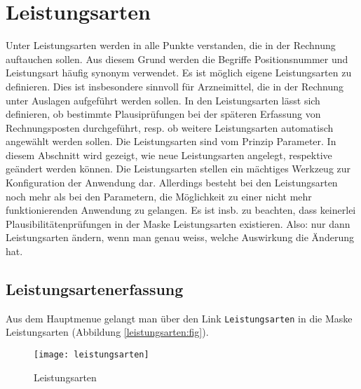 \section{Leistungsarten}\label{leistungsarten:abs}
Unter Leistungsarten werden in \tinyHeb\/ alle Punkte verstanden, die in
der Rechnung auftauchen sollen. Aus diesem Grund werden die Begriffe
Positionsnummer und Leistungsart häufig synonym verwendet.
Es ist möglich eigene Leistungsarten
zu definieren. Dies ist insbesondere sinnvoll für Arzneimittel, die
in der Rechnung unter Auslagen aufgeführt werden sollen. In den
Leistungsarten lässt sich definieren, ob bestimmte Plausiprüfungen bei
der späteren Erfassung von Rechnungsposten durchgeführt,
resp. ob weitere Leistungsarten automatisch angewählt werden sollen.
Die Leistungsarten sind vom Prinzip Parameter. In diesem Abschnitt
wird gezeigt, wie neue Leistungsarten angelegt, respektive geändert
werden können. Die Leistungsarten stellen ein mächtiges Werkzeug zur
Konfiguration der Anwendung dar. Allerdings besteht bei den Leistungsarten
noch mehr als bei den Parametern, die Möglichkeit zu einer nicht mehr
funktionierenden Anwendung zu gelangen. Es ist insb. zu beachten, dass
keinerlei Plausibilitätenprüfungen in der Maske Leistungsarten existieren.
Also: nur dann Leistungsarten
ändern, wenn man genau weiss, welche Auswirkung die Änderung hat.
\marginline{\Huge\bfseries!}%

\subsection{Leistungsartenerfassung}
Aus dem Hauptmenue gelangt man über den Link \nolinkurl{Leistungsarten}
in die Maske Leistungsarten (Abbildung \vref{leistungsarten:fig}).

\begin{figure}[h]
\centering
\texttt{[image: leistungsarten]}
\caption{Leistungsarten\label{leistungsarten:fig}}
\end{figure}

